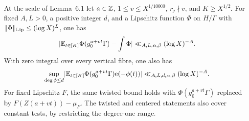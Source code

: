 \begin{proposition}\label{p:heisenberg-phase}
\leanok
{}
At the scale of Lemma~6.1 let $a\in\mathbb Z$,
$1\le v\le X^{1/10000}$, $r_j\nmid v$, and $K\ge X^{1/2}$.
For fixed $A,L>0$, a positive integer $d$, and a Lipschitz function $\Phi$ on $H/\Gamma$
with $\lVert\Phi\rVert_{\mathrm{Lip}}\le(\log X)^L$, one has
\[
 \lvert\mathbb E_{t\in[K]}\Phi(g_0^{a+vt}\Gamma)-\int\Phi\rvert
 \ll_{A,L,\alpha,\beta}(\log X)^{-A}.
\]
With zero integral over every vertical fibre, one also has
\[
 \sup_{\deg\phi\le d}
 \lvert\mathbb E_{t\in[K]}\Phi(g_0^{a+vt}\Gamma)\mathrm e(-\phi(t))\rvert
 \ll_{A,L,d,\alpha,\beta}(\log X)^{-A}.
\]
For fixed Lipschitz $F$, the same twisted bound holds with
$\Phi(g_0^{a+vt}\Gamma)$ replaced by $F(Z(a+vt))-\mu_F$.
The twisted and centered statements also cover constant tests,
by restricting the degree-one range.
\end{proposition}
